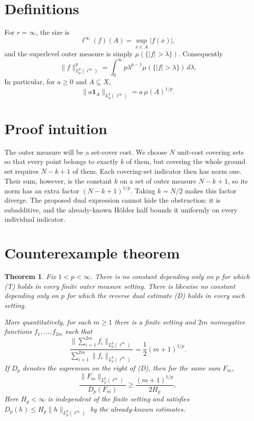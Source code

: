\documentclass[10pt]{article}
\newtheorem{theorem}{Theorem}
\newcommand{\1}{\mathbf 1}
\newcommand{\Lpinf}{L^p_\mu(\ell^\infty)}
\begin{document}
\section*{Definitions}

For $r=\infty$, the size is
\[
 \ell^\infty(f)(A)=\sup_{x\in A}|f(x)|,
\]
and the superlevel outer measure is simply $\mu(\{|f|>\lambda\})$.
Consequently
\[
 \|f\|_{\Lpinf}^p
 =\int_0^\infty p\lambda^{p-1}\mu(\{|f|>\lambda\})\,d\lambda.
 \tag{1}
\]
In particular, for $a\ge0$ and $A\subseteq X$,
\[
             \|a\1_A\|_{\Lpinf}=a\,\mu(A)^{1/p}.               \tag{2}
\]

\section*{Proof intuition}

The outer measure will be a set-cover cost. We choose $N$ unit-cost covering
sets so that every point belongs to exactly $k$ of them, but covering the
whole ground set requires $N-k+1$ of them. Each covering-set indicator then
has norm one. Their sum, however, is the constant $k$ on a set of outer
measure $N-k+1$, so its norm has an extra factor $(N-k+1)^{1/p}$. Taking
$k=N/2$ makes this factor diverge. The proposed dual expression cannot hide
the obstruction: it is subadditive, and the already-known H\"older half bounds
it uniformly on every individual indicator.

\section*{Counterexample theorem}

\begin{theorem}\label{thm:main}
Fix $1<p<\infty$. There is no constant depending only on $p$ for which
\emph{(T)} holds in every finite outer measure setting. There is likewise no
constant depending only on $p$ for which the reverse dual estimate
\emph{(D)} holds in every such setting.

More quantitatively, for each $m\ge1$ there is a finite setting and $2m$
nonnegative functions $f_1,\dots,f_{2m}$ such that
\[
 \frac{\|\sum_{i=1}^{2m}f_i\|_{L^p_\mu(\ell^\infty)}}
      {\sum_{i=1}^{2m}\|f_i\|_{L^p_\mu(\ell^\infty)}}
       =\frac12(m+1)^{1/p}.                                    \tag{3}
\]
If $D_p$ denotes the supremum on the right of \emph{(D)}, then for the same
sum $F_m$,
\[
 \frac{\|F_m\|_{L^p_\mu(\ell^\infty)}}{D_p(F_m)}
 \ge \frac{(m+1)^{1/p}}{2H_p},                                \tag{4}
\]
Here $H_p<\infty$ is independent of the finite setting and satisfies
$D_p(h)\le H_p\|h\|_{L^p_\mu(\ell^\infty)}$ by the already-known estimates.
\end{theorem}
\end{document}
